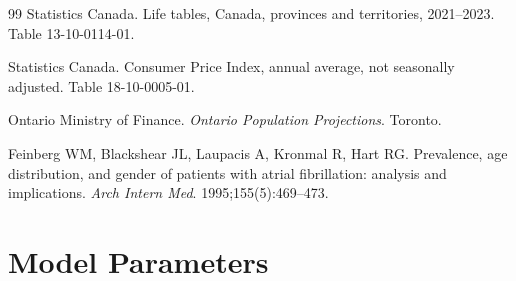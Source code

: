\documentclass[11pt,letterpaper]{article}
\begin{document}
\begin{thebibliography}{99}
Statistics Canada. Life tables, Canada, provinces and territories, 2021--2023. Table 13-10-0114-01.

Statistics Canada. Consumer Price Index, annual average, not seasonally adjusted. Table
18-10-0005-01.

Ontario Ministry of Finance. \textit{Ontario Population Projections}. Toronto.

Feinberg WM, Blackshear JL, Laupacis A, Kronmal R, Hart RG. Prevalence, age distribution, and gender
of patients with atrial fibrillation: analysis and implications. \textit{Arch Intern Med}.
1995;155(5):469--473.

\end{thebibliography}

\clearpage
\appendix
\section{Model Parameters}
\label{app:params}
\end{document}
